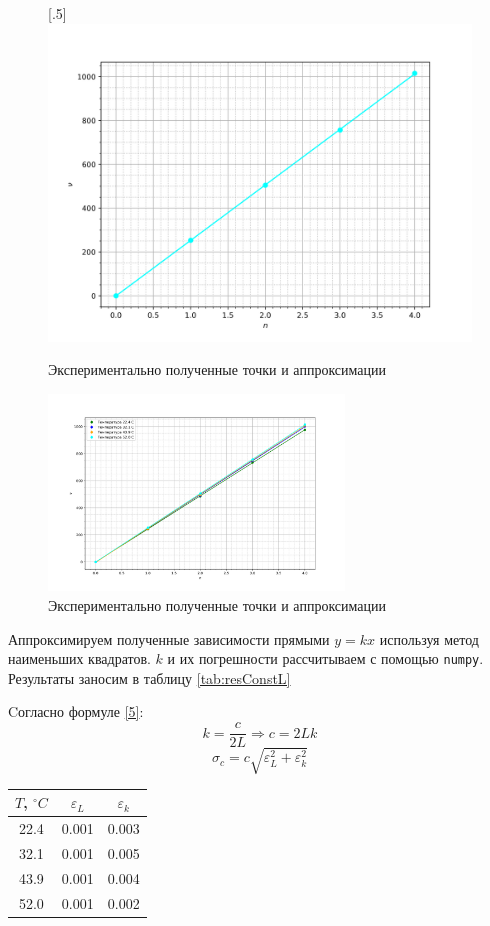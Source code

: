 \documentclass{article}
\begin{document}
\begin{figure}[h!]
{	}%
	\hfill
	[.5\linewidth]{%
		\includegraphics[width=\linewidth]{fourth.png}%
	}
	\caption{Экспериментально полученные точки и аппроксимации}
\end{figure}

\newpage

\begin{figure}[h!]
	\centering
	\includegraphics[width=0.7\textwidth]{all_in_one.png}
	\caption{Экспериментально полученные точки и аппроксимации}
\end{figure}

Аппроксимируем полученные зависимости прямыми $ y=kx $ используя метод наименьших квадратов. $k$ и их погрешности рассчитываем с помощью \texttt{numpy}. Результаты заносим в таблицу \ref{tab:resConstL}

Cогласно формуле \eqref{5}:
$$k = \frac{c}{2L} \Rightarrow c = 2 L k$$
$$\sigma_c = c\sqrt{\varepsilon_L^2 + \varepsilon_k^2}$$

\begin{table}[h!]
	\centering
	\begin{tabular}{|c|c|c|}
		\hline
		$ T $, $^{\circ}C$ & $\varepsilon_L$ & $\varepsilon_k$ \\ \hline
		22.4               & 0.001           & 0.003           \\ \hline
		32.1               & 0.001           & 0.005           \\ \hline
		43.9               & 0.001           & 0.004           \\ \hline
		52.0               & 0.001           & 0.002           \\ \hline
	\end{tabular}
\end{table}
\end{document}

